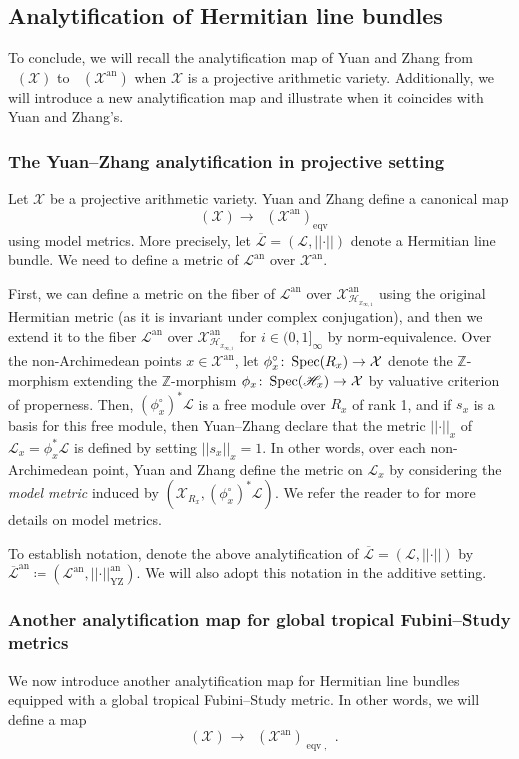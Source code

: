 \documentclass[11pt,reqno]{amsart}
\newcommand{\mZ}{\mathbb{Z}}
\newcommand{\cX}{\mathcal{X}}
\newcommand{\cL}{\mathcal{L}}
\newcommand{\nrm}[1]{\left|\left |#1\right |\right |}
\newcommand{\sH}{{\mathscr H}}
\theoremstyle{theorem}
\numberwithin{equation}{subsection}
\numberwithin{equation}{subsection}
\theoremstyle{definition}
\theoremstyle{remark}
\numberwithin{equation}{subsubsection} \numberwithin{figure}{section}
\DeclareMathOperator{\an}{an}
\DeclareMathOperator{\aPic}{\widehat{Pic}}
\newcommand{\cdef}[1]{\textsf{\textit{#1}}}
\DeclareMathOperator{\tFS}{FS^{\tau}}
\DeclareMathOperator{\gtFS}{g.FS^{\tau}}
\DeclareMathOperator{\eqv}{eqv}
\DeclareMathOperator{\YZ}{YZ}
\begin{document}
\subsection{Analytification of Hermitian line bundles}
To conclude, we will recall the analytification map of Yuan and Zhang from $\aPic(\cX)$ to $\aPic(\cX^{\an})$ when $\cX$ is a projective arithmetic variety. 
Additionally, we will introduce a new analytification map and illustrate when it coincides with Yuan and Zhang's.

\subsubsection{The Yuan--Zhang analytification in projective setting}
Let $\cX$ be a projective arithmetic variety. 
Yuan and Zhang define a canonical map
\[
\aPic(\cX) \to \aPic(\cX^{\an})_{\eqv}
\]
using model metrics. 
More precisely, let $\overline{\cL} = (\cL,\nrm{\cdot})$ denote a Hermitian line bundle. 
We need to define a metric of $\cL^{\an}$ over $\cX^{\an}$. 


First, we can define a metric on the fiber of $\cL^{\an}$ over $\cX_{\sH_{x_{\infty,1}}}^{\an}$ using the original Hermitian metric (as it is invariant under complex conjugation), and then we extend it to the fiber $\cL^{\an}$ over $\cX_{\sH_{x_{\infty,i}}}^{\an}$ for $i \in (0,1]_{\infty}$ by norm-equivalence. 
Over the non-Archimedean points $x\in \cX^{\an}$, let $\phi_x^{\circ}\colon \Spec(R_x) \to \cX$ denote the $\mZ$-morphism extending the $\mZ$-morphism $\phi_x\colon \Spec(\sH_x) \to \cX$ by valuative criterion of properness. 
Then, $(\phi_x^{\circ})^*\cL$ is a free module over $R_x$ of rank 1, and if $s_x$ is a basis for this free module, then Yuan--Zhang declare that the metric $
\nrm{\cdot}_x$ of $\cL_x = \phi_x^{*}\cL$ is defined by setting $\nrm{s_x}_x = 1$. In other words, over each non-Archimedean point, Yuan and Zhang define the metric on $\cL_x$ by considering the \cdef{model metric} induced by $(\cX_{R_x},(\phi_x^{\circ})^*\cL)$. We refer the reader to \cite[Section 2.7]{BoucksomJonsson:SingularPSH} for more details on model metrics. 

To establish notation, denote the above analytification of $\overline{\cL} = (\cL,\nrm{\cdot})$ by $\overline{\cL}^{\an} \coloneqq (\cL^{\an},\nrm{\cdot}^{\an}_{\YZ})$. 
We will also adopt this notation in the additive setting. 

\subsubsection{Another analytification map for global tropical Fubini--Study metrics}
\label{subsubsec:analytificationnew}
We now introduce another analytification map for Hermitian line bundles equipped with a global tropical Fubini--Study metric. 
In other words, we will define a map
\[
\aPic(\cX)_{\gtFS} \to \aPic(\cX^{\an})_{\eqv, \tFS}. 
\]
\end{document}
